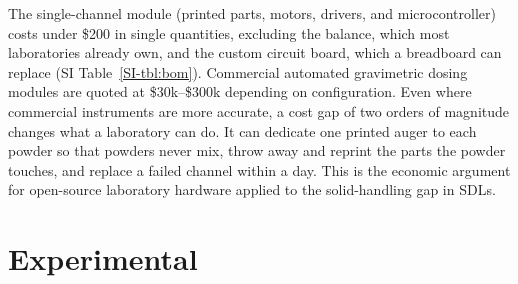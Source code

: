 \documentclass[twoside,twocolumn,9pt]{article}
\newcommand{\siref}[1]{\ref*{SI-#1}}
\begin{document}
The single-channel module (printed parts, motors, drivers, and microcontroller) costs under \$200 in single quantities, excluding the balance, which most laboratories already own, and the custom circuit board, which a breadboard can replace (SI Table~\siref{tbl:bom}). Commercial automated gravimetric dosing modules are quoted at \$30k--\$300k depending on configuration. Even where commercial instruments are more accurate, a cost gap of two orders of magnitude changes what a laboratory can do. It can dedicate one printed auger to each powder so that powders never mix, throw away and reprint the parts the powder touches, and replace a failed channel within a day. This is the economic argument for open-source laboratory hardware\cite{Pearce2020Economic,Hohlbein2022Open} applied to the solid-handling gap in SDLs. %

\section{Experimental}
\label{sec:methods}
\end{document}
